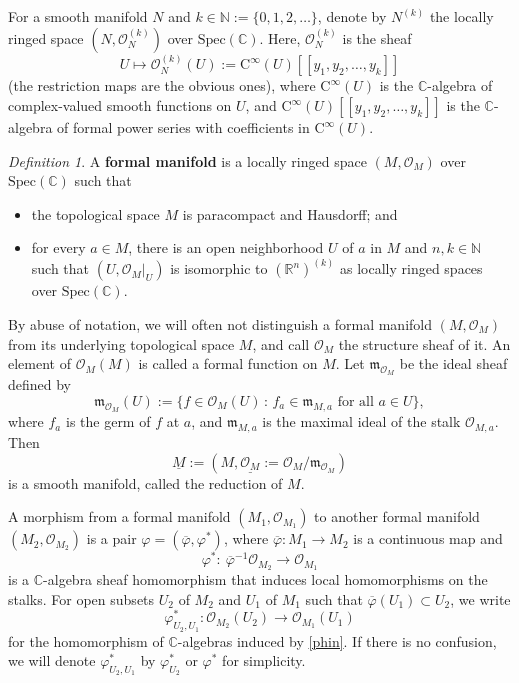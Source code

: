 \documentclass[12pt, a4paper]{amsart}
\newcommand{\BC}{{\mathbb {C}}}
\newcommand{\BN}{{\mathbb {N}}}
\newcommand{\CO}{{\mathcal {O}}}
\newcommand{\RC}{{\mathrm {C}}}
\newcommand{\m}{\mathfrak m}
\newcommand{\C}{\mathbb{C}}
\newcommand{\R}{\mathbb R}
\newcommand{\be}{\begin {equation}}
\newcommand{\ee}{\end {equation}}
\newcommand{\qaq}{\quad\textrm{and}\quad}
\renewcommand{\mid}{\,:\,}
\theoremstyle{Theorem}
\theoremstyle{Theorem}
\theoremstyle{Theorem}
\theoremstyle{Theorem}
\theoremstyle{Plain}
\theoremstyle{remark}
\theoremstyle{remark}
\theoremstyle{Definition}
\newtheorem{dfn}{Definition}[section]
\numberwithin{equation}{section}
\begin{document}
For a smooth manifold $N$ and $k\in \BN:=\{0,1,2,\dots\}$, denote by $N^{(k)}$ the locally ringed space $(N, \CO_N^{(k)})$ over $\mathrm{Spec}(\BC)$.
 Here, $\CO_N^{(k)}$ is the sheaf 
\[ U\mapsto
\CO_N^{(k)}(U):=\RC^\infty(U)[[y_1,y_2,\dots,y_k]]
\] (the restriction maps are the obvious ones), 
where $\RC^\infty(U)$ is the $\BC$-algebra of complex-valued smooth functions on $U$, and $\RC^\infty(U)[[y_1,y_2,\dots,y_k]]$ is the $\BC$-algebra of formal power series with coefficients in $\RC^\infty(U)$.
\begin{dfn}\label{def:formalmanifold}
	A \textbf{formal manifold} is a locally ringed space $(M, \CO_M)$ over $\mathrm{Spec}(\BC)$ such that
	\begin{itemize}
		\item the topological space $M$ is paracompact and Hausdorff; and
		\item for every $a\in M$, there is an open neighborhood $U$ of $a$ in $M$ and $n,k\in \BN$ such that $(U, \CO_M|_U)$ is isomorphic to $(\R^n)^{(k)}$ as locally ringed spaces over $\mathrm{Spec}(\BC)$.
	\end{itemize}
\end{dfn}
By abuse of notation, we will often not distinguish a formal manifold $(M, \CO_M)$ from its underlying topological space $M$, and call $\CO_M$ the structure sheaf of it. 
An element of $\CO_M(M)$ is called a formal function on $M$.
Let $\m_{\CO_M}$ be the ideal sheaf defined by
\be\label{eq:defmo}
\m_{\CO_M}(U):=\{f\in \CO_M(U)\mid f_a\in \m_{M,a} \textrm{ for all $a\in U$}\},
\ee
where $f_a$ is the germ of $f$ at $a$, and $\m_{M,a}$ is the maximal
ideal of the stalk $\CO_{M,a}$.
Then
\be \label{eq:underM}
\underline{M}:=(M,\underline{\CO_M}:=\CO_M/\m_{\CO_M})
\ee
is a smooth manifold, called the reduction of $M$.



A morphism from a formal manifold $(M_1,\CO_{M_1})$ to another formal manifold $(M_2,\CO_{M_2})$ is a pair $\varphi=(\overline\varphi, \varphi^*)$, where $\overline\varphi: M_1\rightarrow M_2$ is a continuous map and
\be\label{phin}
\varphi^*:\ \overline\varphi^{-1}\CO_{M_2}\rightarrow \CO_{M_1}
\ee
is a $\BC$-algebra sheaf homomorphism that induces local homomorphisms on the stalks.
For open subsets $U_2$ of $M_2$ and $U_1$ of $M_1$ such that $\overline\varphi(U_1)\subset U_2$,
we write
\[\varphi^*_{U_2,U_1}:\CO_{M_2}(U_2)\rightarrow \CO_{M_1}(U_1)\] for the homomorphism of $\C$-algebras induced by \eqref{phin}.
If there is no confusion, we will denote $\varphi^*_{U_2,U_1}$ by $\varphi^*_{U_2}$ or $\varphi^*$ for simplicity.
\end{document}
